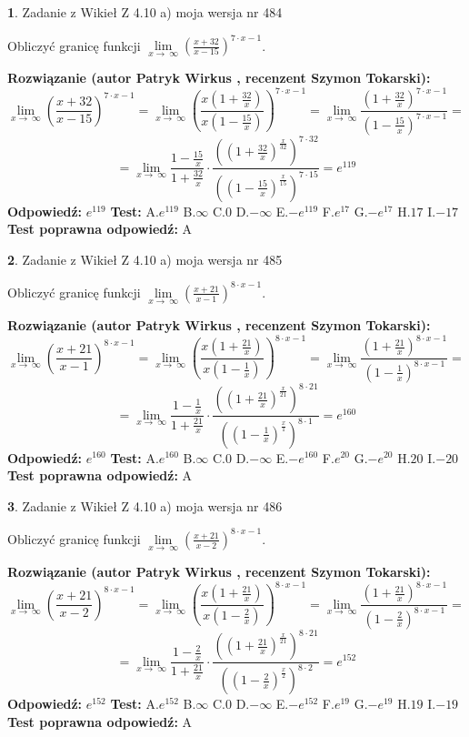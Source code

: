 \documentclass[12pt, a4paper]{article}
\theoremstyle{definition} %
\newtheorem{zad}{}
\newcommand{\zadStart}[1]{\begin{zad}#1\newline}
\newcommand{\zadStop}{\end{zad}}
\newcommand{\rozwStart}[2]{\noindent \textbf{Rozwiązanie (autor #1 , recenzent #2): }\newline}
\newcommand{\rozwStop}{\newline}
\newcommand{\odpStart}{\noindent \textbf{Odpowiedź:}\newline}
\newcommand{\odpStop}{\newline}
\newcommand{\testStart}{\noindent \textbf{Test:}\newline}
\newcommand{\testStop}{\newline}
\newcommand{\kluczStart}{\noindent \textbf{Test poprawna odpowiedź:}\newline}
\newcommand{\kluczStop}{\newline}
\begin{document}
\zadStart{Zadanie z Wikieł Z 4.10 a) moja wersja nr 484}

Obliczyć granicę funkcji  $\lim\limits_{x\to\ \infty}(\frac{x+32}{x-15})^{7\cdot x-1}$.
\zadStop
\rozwStart{Patryk Wirkus}{Szymon Tokarski}
$$\lim\limits_{x\to\ \infty}(\frac{x+32}{x-15})^{7\cdot x-1} = \lim\limits_{x\to\ \infty}(\frac{x(1+\frac{32}{x})}{x(1-\frac{15}{x})})^{7\cdot x-1}=\lim\limits_{x\to\ \infty}\frac{(1+\frac{32}{x})^{7\cdot x-1}}{(1-\frac{15}{x})^{7\cdot x-1}}=$$
$$=\lim\limits_{x\to\ \infty}\frac{1-\frac{15}{x}}{1+\frac{32}{x}}\cdot\frac{((1+\frac{32}{x})^{\frac{x}{32}})^{7\cdot32}}{((1-\frac{15}{x})^{\frac{x}{15}})^{7\cdot15}}=e^{119}$$
\rozwStop
\odpStart
$e^{119}$
\odpStop
\testStart
A.$e^{119}$ B.$\infty$ C.$0$ D.$-\infty$ E.$-e^{119}$
F.$e^{17}$ G.$-e^{17}$
H.$17$
I.$-17$
\testStop
\kluczStart
A
\kluczStop



\zadStart{Zadanie z Wikieł Z 4.10 a) moja wersja nr 485}

Obliczyć granicę funkcji  $\lim\limits_{x\to\ \infty}(\frac{x+21}{x-1})^{8\cdot x-1}$.
\zadStop
\rozwStart{Patryk Wirkus}{Szymon Tokarski}
$$\lim\limits_{x\to\ \infty}(\frac{x+21}{x-1})^{8\cdot x-1} = \lim\limits_{x\to\ \infty}(\frac{x(1+\frac{21}{x})}{x(1-\frac{1}{x})})^{8\cdot x-1}=\lim\limits_{x\to\ \infty}\frac{(1+\frac{21}{x})^{8\cdot x-1}}{(1-\frac{1}{x})^{8\cdot x-1}}=$$
$$=\lim\limits_{x\to\ \infty}\frac{1-\frac{1}{x}}{1+\frac{21}{x}}\cdot\frac{((1+\frac{21}{x})^{\frac{x}{21}})^{8\cdot21}}{((1-\frac{1}{x})^{\frac{x}{1}})^{8\cdot1}}=e^{160}$$
\rozwStop
\odpStart
$e^{160}$
\odpStop
\testStart
A.$e^{160}$ B.$\infty$ C.$0$ D.$-\infty$ E.$-e^{160}$
F.$e^{20}$ G.$-e^{20}$
H.$20$
I.$-20$
\testStop
\kluczStart
A
\kluczStop



\zadStart{Zadanie z Wikieł Z 4.10 a) moja wersja nr 486}

Obliczyć granicę funkcji  $\lim\limits_{x\to\ \infty}(\frac{x+21}{x-2})^{8\cdot x-1}$.
\zadStop
\rozwStart{Patryk Wirkus}{Szymon Tokarski}
$$\lim\limits_{x\to\ \infty}(\frac{x+21}{x-2})^{8\cdot x-1} = \lim\limits_{x\to\ \infty}(\frac{x(1+\frac{21}{x})}{x(1-\frac{2}{x})})^{8\cdot x-1}=\lim\limits_{x\to\ \infty}\frac{(1+\frac{21}{x})^{8\cdot x-1}}{(1-\frac{2}{x})^{8\cdot x-1}}=$$
$$=\lim\limits_{x\to\ \infty}\frac{1-\frac{2}{x}}{1+\frac{21}{x}}\cdot\frac{((1+\frac{21}{x})^{\frac{x}{21}})^{8\cdot21}}{((1-\frac{2}{x})^{\frac{x}{2}})^{8\cdot2}}=e^{152}$$
\rozwStop
\odpStart
$e^{152}$
\odpStop
\testStart
A.$e^{152}$ B.$\infty$ C.$0$ D.$-\infty$ E.$-e^{152}$
F.$e^{19}$ G.$-e^{19}$
H.$19$
I.$-19$
\testStop
\kluczStart
A
\kluczStop
\end{document}
